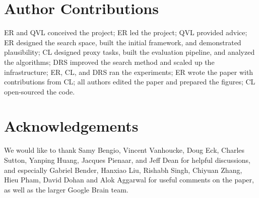 \documentclass{article}
\begin{document}
\section*{Author Contributions}
ER and QVL conceived the project; ER led the project; QVL provided advice; ER designed the search space, built the initial framework, and demonstrated plausibility; CL designed proxy tasks, built the evaluation pipeline, and analyzed the algorithms; DRS improved the search method and scaled up the infrastructure; ER, CL, and DRS ran the experiments; ER wrote the paper with contributions from CL; all authors edited the paper and prepared the figures; CL open-sourced the code.

\section*{Acknowledgements}
We would like to thank Samy Bengio, Vincent Vanhoucke, Doug Eck, Charles Sutton, Yanping Huang, Jacques Pienaar, and Jeff Dean for helpful discussions, and especially Gabriel Bender, Hanxiao Liu, Rishabh Singh, Chiyuan Zhang, Hieu Pham, David Dohan and Alok Aggarwal for useful comments on the paper, as well as the larger Google Brain team.






\end{document}
